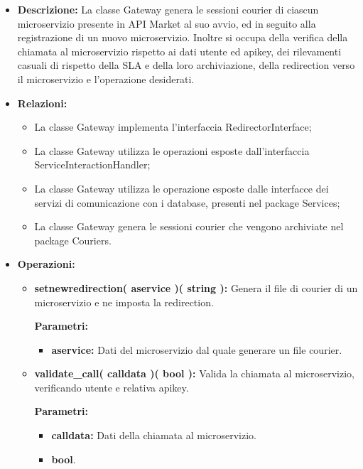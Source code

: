 \begin{itemize}
	\item \textbf{Descrizione:} La classe Gateway genera le sessioni courier di ciascun microservizio presente in API Market al suo avvio, ed in seguito alla registrazione di un nuovo microservizio. Inoltre si occupa della verifica della chiamata al microservizio rispetto ai dati utente ed apikey, dei rilevamenti casuali di rispetto della SLA e della loro archiviazione, della redirection verso il microservizio e l'operazione desiderati.
	\item \textbf{Relazioni:}
		\begin{itemize}
			\item La classe Gateway implementa l'interfaccia RedirectorInterface;
			\item La classe Gateway utilizza le operazioni esposte dall'interfaccia ServiceInteractionHandler;
			\item La classe Gateway utilizza le operazione esposte dalle interfacce dei servizi di comunicazione con i database, presenti nel package Services;
			\item La classe Gateway genera le sessioni courier che vengono archiviate nel package Couriers.
		\end{itemize}
	\item \textbf{Operazioni:}
		\begin{itemize}
			\item \textbf{setnewredirection( aservice )( string ):} Genera il file di courier di un microservizio e ne imposta la redirection.
				\begin{description}
    				\item[\textbf{Parametri:}]
				\end{description}
				\begin{itemize}
					\item \textbf{aservice:} Dati del microservizio dal quale generare un file courier. 
				\end{itemize}
			\item \textbf{validate\_call( calldata )( bool ):} Valida la chiamata al microservizio, verificando utente e relativa apikey. 
				\begin{description}
    				\item[\textbf{Parametri:}]
				\end{description}
				\begin{itemize}
					\item \textbf{calldata:} Dati della chiamata al microservizio.
					\item \textbf{bool}.

\end{itemize}
\end{itemize}
\end{itemize}
